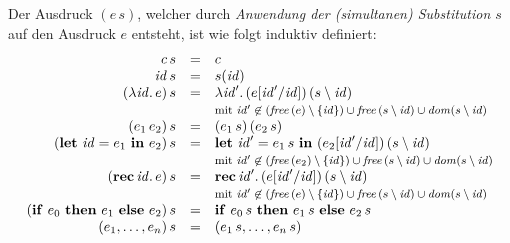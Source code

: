 \documentclass[12pt,fleqn,a4paper]{article}
\begin{document}
\begin{definition}
  Der Ausdruck $(e\,s)$, welcher durch \emph{Anwendung der (simultanen) Substitution $s$} auf den Ausdruck $e$
  entsteht, ist wie folgt induktiv definiert:
  \[\begin{array}{rcl}
    c\,s &=& c \\
    \id\,s &=& s(\id) \\
    (\abstr{\id}{e})\,s &=& \abstr{\id'}{(e[\id'/\id])\,(s \setminus \id)} \\
    && \text{\footnotesize{mit
        $\id'\not\in(\free{e}\setminus\{\id\}) \cup \free{s\setminus\id} \cup \dom{s\setminus\id}$}} \\
    (\app{e_1}{e_2})\,s &=& \app{(e_1\,s)}{(e_2\,s)} \\
    (\bli{\id}{e_1}{e_2})\,s &=& \bli{\id'}{e_1\,s}{(e_2[\id'/\id])\,(s \setminus\id)} \\
    && \text{\footnotesize{mit
        $\id'\not\in(\free{e_2}\setminus\{\id\}) \cup \free{s\setminus\id} \cup \dom{s\setminus\id}$}} \\
    (\rec{\id}{e})\,s &=& \rec{\id'}{(e[\id'/\id])\,(s\setminus\id)} \\
    && \text{\footnotesize{mit
        $\id'\not\in(\free{e}\setminus\{\id\}) \cup \free{s\setminus\id} \cup \dom{s\setminus\id}$}} \\
    (\bifte{e_0}{e_1}{e_2})\,s &=& \bifte{e_0\,s}{e_1\,s}{e_2\,s} \\
    (e_1,\ldots,e_n)\,s &=& (e_1\,s,\ldots,e_n\,s) \\
  \end{array}\]
\end{definition}
\end{document}
